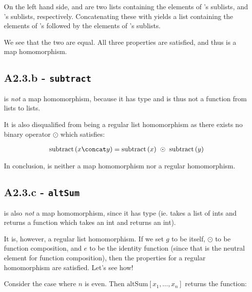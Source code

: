 \medskip

On the left hand side,  and  are two lists containing
the elements of 's sublists, and 's sublists, respectively.
Concatenating these with \ms{(++)} yields a list containing the elements of
's followed by the elements of 's sublists.

\medskip

We see that the two are equal. All three properties are satisfied, and thus
 is a map homomorphism.

\sectend


\subsection{A2.3.b - \texttt{subtract}}

 is \emph{not} a map homomorphism, because it has type  and is thus not a function from lists to lists.

\medskip

It is also disqualified from being a regular list homomorphism as there exists
no binary operator $\odot$ which satisfies:

\begin{align*}
\text{subtract}\,(x \concat y) = \text{subtract}\,(x) \ \odot \ \text{subtract}\, (y)
\end{align*}


In conclusion,  is neither a map homomorphism nor a regular
homomorphism.

\sectend

\subsection{A2.3.c - \texttt{altSum}}

 is also \emph{not} a map homomorphism, since it has type  (ie. takes a list of ints and returns a function which takes an
int and returns an int).

\medskip

It is, however, a regular list homomorphism. If we set $g$ to be 
itself, $\odot$ to be function composition, and $e$ to be the identity function
(since that is the neutral element for function composition), then the
properties for a regular homomorphism are satisfied. Let's see how!

\bigskip

Consider the case where $n$ is even. Then $\text{altSum} [x_1, \dots, x_n]$
returns the function:

